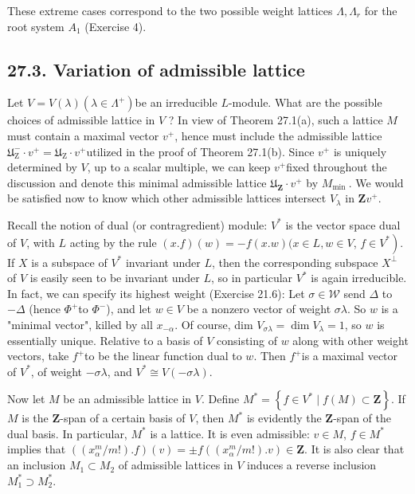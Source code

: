 \documentclass[10pt]{article}
\begin{document}
These extreme cases correspond to the two possible weight lattices $\Lambda, \Lambda_{r}$ for the root system $A_{1}$ (Exercise 4).

\subsection*{27.3. Variation of admissible lattice}
Let $V=V(\lambda)\left(\lambda \in \Lambda^{+}\right)$be an irreducible $L$-module. What are the possible choices of admissible lattice in $V$ ? In view of Theorem 27.1(a), such a lattice $M$ must contain a maximal vector $v^{+}$, hence must include the admissible lattice $\mathfrak{U}_{\mathrm{Z}}^{-} \cdot v^{+}=\mathfrak{U}_{\mathrm{Z}} \cdot v^{+}$utilized in the proof of Theorem 27.1(b). Since $v^{+}$ is uniquely determined by $V$, up to a scalar multiple, we can keep $v^{+}$fixed throughout the discussion and denote this minimal admissible lattice $\mathfrak{U}_{\mathbf{Z}} \cdot v^{+}$ by $M_{\text {min }}$. We would be satisfied now to know which other admissible lattices intersect $V_{\lambda}$ in $\mathbf{Z} v^{+}$.

Recall the notion of dual (or contragredient) module: $V^{*}$ is the vector space dual of $V$, with $L$ acting by the rule $(x . f)(w)=-f(x . w)(x \in L, w \in V$, $\left.f \in V^{*}\right)$. If $X$ is a subspace of $V^{*}$ invariant under $L$, then the corresponding subspace $X^{\perp}$ of $V$ is easily seen to be invariant under $L$, so in particular $V^{*}$ is again irreducible. In fact, we can specify its highest weight (Exercise 21.6): Let $\sigma \in \mathscr{W}$ send $\Delta$ to $-\Delta$ (hence $\Phi^{+}$to $\Phi^{-}$), and let $w \in V$ be a nonzero vector of weight $\sigma \lambda$. So $w$ is a "minimal vector", killed by all $x_{-\alpha}$. Of course, dim $V_{\sigma \lambda}=\operatorname{dim} V_{\lambda}=1$, so $w$ is essentially unique. Relative to a basis of $V$ consisting of $w$ along with other weight vectors, take $f^{+}$to be the linear function dual to $w$. Then $f^{+}$is a maximal vector of $V^{*}$, of weight $-\sigma \lambda$, and $V^{*} \cong V(-\sigma \lambda)$.

Now let $M$ be an admissible lattice in $V$. Define $M^{*}=\left\{f \in V^{*} \mid f(M) \subset \mathbf{Z}\right\}$. If $M$ is the $\mathbf{Z}$-span of a certain basis of $V$, then $M^{*}$ is evidently the $\mathbf{Z}$-span of the dual basis. In particular, $M^{*}$ is a lattice. It is even admissible: $v \in M$, $f \in M^{*}$ implies that $\left(\left(x_{\alpha}^{m} / m!\right) . f\right)(v)= \pm f\left(\left(x_{\alpha}^{m} / m!\right) . v\right) \in \mathbf{Z}$. It is also clear that an inclusion $M_{1} \subset M_{2}$ of admissible lattices in $V$ induces a reverse inclusion $M_{1}^{*} \supset M_{2}^{*}$.
\end{document}
